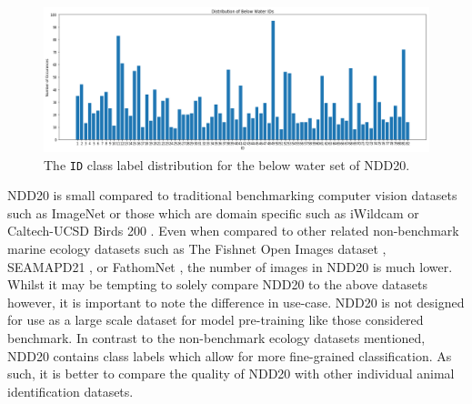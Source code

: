 \begin{figure}
	\begin{center}
		\includegraphics[scale=0.35]{Chapter4/figs/belowWaterIDDist.png}
	\end{center}
	\caption{The \texttt{ID} class label distribution for the below water set of NDD20.}
	\label{fig:below-water-id-dist}
\end{figure}

NDD20 is small compared to traditional benchmarking computer vision datasets such as ImageNet \cite{deng_imagenet:_2009} or those which are domain specific such as iWildcam \cite{beery_iwildcam_2019} or Caltech-UCSD Birds 200 \cite{welinder_caltech-ucsd_2010}. Even when compared to other related non-benchmark marine ecology datasets such as The Fishnet Open Images dataset \cite{kay_fishnet_2021}, SEAMAPD21 \cite{boulais_seamapd21_2021}, or FathomNet \cite{katija_fathomnet_2022}, the number of images in NDD20 is much lower. Whilst it may be tempting to solely compare NDD20 to the above datasets however, it is important to note the difference in use-case. NDD20 is not designed for use as a large scale dataset for model pre-training like those considered benchmark. In contrast to the non-benchmark ecology datasets mentioned, NDD20 contains class labels which allow for more fine-grained classification. As such, it is better to compare the quality of NDD20 with other individual animal identification datasets.

